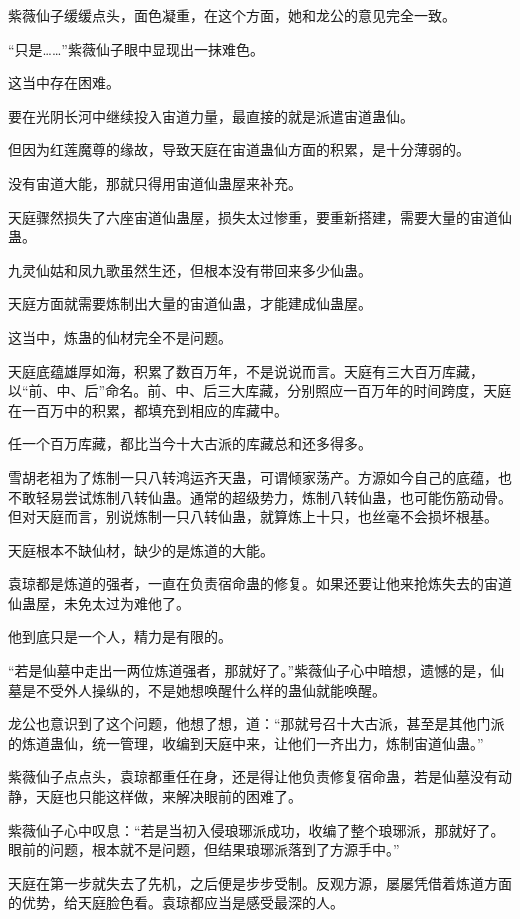 \begin{this_body}
紫薇仙子缓缓点头，面色凝重，在这个方面，她和龙公的意见完全一致。

“只是……”紫薇仙子眼中显现出一抹难色。

这当中存在困难。

要在光阴长河中继续投入宙道力量，最直接的就是派遣宙道蛊仙。

但因为红莲魔尊的缘故，导致天庭在宙道蛊仙方面的积累，是十分薄弱的。

没有宙道大能，那就只得用宙道仙蛊屋来补充。

天庭骤然损失了六座宙道仙蛊屋，损失太过惨重，要重新搭建，需要大量的宙道仙蛊。

九灵仙姑和凤九歌虽然生还，但根本没有带回来多少仙蛊。

天庭方面就需要炼制出大量的宙道仙蛊，才能建成仙蛊屋。

这当中，炼蛊的仙材完全不是问题。

天庭底蕴雄厚如海，积累了数百万年，不是说说而言。天庭有三大百万库藏，以“前、中、后”命名。前、中、后三大库藏，分别照应一百万年的时间跨度，天庭在一百万中的积累，都填充到相应的库藏中。

任一个百万库藏，都比当今十大古派的库藏总和还多得多。

雪胡老祖为了炼制一只八转鸿运齐天蛊，可谓倾家荡产。方源如今自己的底蕴，也不敢轻易尝试炼制八转仙蛊。通常的超级势力，炼制八转仙蛊，也可能伤筋动骨。但对天庭而言，别说炼制一只八转仙蛊，就算炼上十只，也丝毫不会损坏根基。

天庭根本不缺仙材，缺少的是炼道的大能。

袁琼都是炼道的强者，一直在负责宿命蛊的修复。如果还要让他来抢炼失去的宙道仙蛊屋，未免太过为难他了。

他到底只是一个人，精力是有限的。

“若是仙墓中走出一两位炼道强者，那就好了。”紫薇仙子心中暗想，遗憾的是，仙墓是不受外人操纵的，不是她想唤醒什么样的蛊仙就能唤醒。

龙公也意识到了这个问题，他想了想，道：“那就号召十大古派，甚至是其他门派的炼道蛊仙，统一管理，收编到天庭中来，让他们一齐出力，炼制宙道仙蛊。”

紫薇仙子点点头，袁琼都重任在身，还是得让他负责修复宿命蛊，若是仙墓没有动静，天庭也只能这样做，来解决眼前的困难了。

紫薇仙子心中叹息：“若是当初入侵琅琊派成功，收编了整个琅琊派，那就好了。眼前的问题，根本就不是问题，但结果琅琊派落到了方源手中。”

天庭在第一步就失去了先机，之后便是步步受制。反观方源，屡屡凭借着炼道方面的优势，给天庭脸色看。袁琼都应当是感受最深的人。


\end{this_body}
